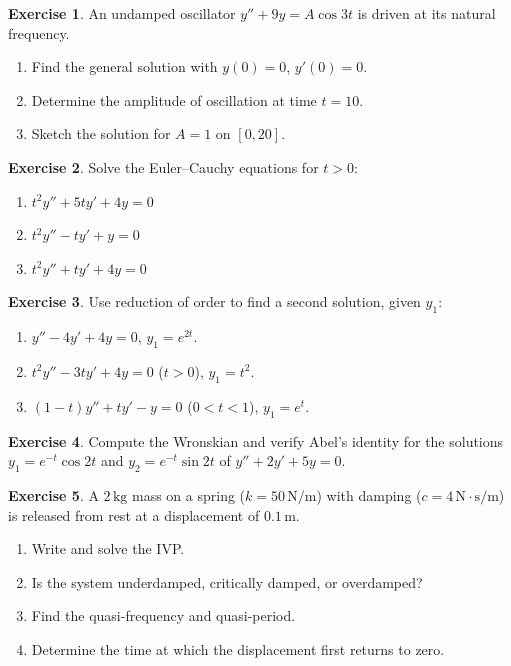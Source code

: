\documentclass[12pt,a4paper,openany]{book}
\theoremstyle{definition}
\newtheorem{exercise}{Exercise}[chapter]
\theoremstyle{plain}
\theoremstyle{remark}
\begin{document}
\begin{exercise}\label{exer:resonance-exercise}
An undamped oscillator $y'' + 9y = A\cos 3t$ is driven at its natural frequency.
\begin{enumerate}[label=(\alph*)]
  \item Find the general solution with $y(0) = 0$, $y'(0) = 0$.
  \item Determine the amplitude of oscillation at time $t = 10$.
  \item Sketch the solution for $A = 1$ on $[0, 20]$.
\end{enumerate}
\end{exercise}

\begin{exercise}\label{exer:euler-cauchy-exercise}
Solve the Euler--Cauchy equations for $t > 0$:
\begin{enumerate}[label=(\alph*)]
  \item $t^2 y'' + 5ty' + 4y = 0$
  \item $t^2 y'' - ty' + y = 0$
  \item $t^2 y'' + ty' + 4y = 0$
\end{enumerate}
\end{exercise}

\begin{exercise}\label{exer:reduction-practice}
Use reduction of order to find a second solution, given $y_1$:
\begin{enumerate}[label=(\alph*)]
  \item $y'' - 4y' + 4y = 0$, $y_1 = e^{2t}$.
  \item $t^2 y'' - 3ty' + 4y = 0$ ($t > 0$), $y_1 = t^2$.
  \item $(1-t)y'' + ty' - y = 0$ ($0 < t < 1$), $y_1 = e^t$.
\end{enumerate}
\end{exercise}

\begin{exercise}\label{exer:wronskian-compute}
Compute the Wronskian and verify Abel's identity for the solutions
$y_1 = e^{-t}\cos 2t$ and $y_2 = e^{-t}\sin 2t$ of $y'' + 2y' + 5y = 0$.
\end{exercise}

\begin{exercise}\label{exer:application-spring}
A $2\,\mathrm{kg}$ mass on a spring ($k = 50\,\mathrm{N/m}$) with damping
($c = 4\,\mathrm{N\cdot s/m}$) is released from rest at a displacement of
$0.1\,\mathrm{m}$.
\begin{enumerate}[label=(\alph*)]
  \item Write and solve the IVP.
  \item Is the system underdamped, critically damped, or overdamped?
  \item Find the quasi-frequency and quasi-period.
  \item Determine the time at which the displacement first returns to zero.
\end{enumerate}
\end{exercise}
\end{document}
